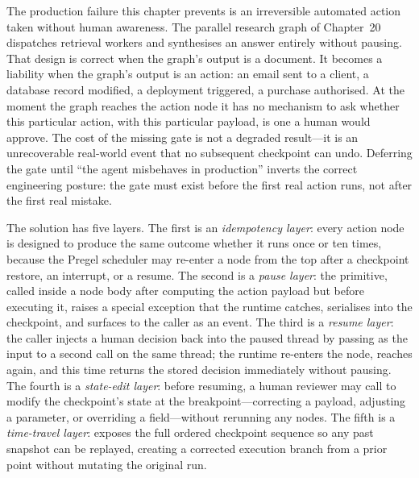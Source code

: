 

The production failure this chapter prevents is an irreversible automated
action taken without human awareness. The parallel research graph of
Chapter~20 dispatches retrieval workers and synthesises an answer entirely
without pausing. That design is correct when the graph's output is a
document. It becomes a liability when the graph's output is an action: an
email sent to a client, a database record modified, a deployment triggered,
a purchase authorised. At the moment the graph reaches the action node it
has no mechanism to ask whether this particular action, with this particular
payload, is one a human would approve. The cost of the missing gate is not a
degraded result---it is an unrecoverable real-world event that no subsequent
checkpoint can undo. Deferring the gate until ``the agent misbehaves in
production'' inverts the correct engineering posture: the gate must exist
before the first real action runs, not after the first real mistake.

The solution has five layers. The first is an \emph{idempotency layer}:
every action node is designed to produce the same outcome whether it runs
once or ten times, because the Pregel scheduler may re-enter a node from
the top after a checkpoint restore, an interrupt, or a resume. The second
is a \emph{pause layer}: the  primitive, called inside a
node body after computing the action payload but before executing it, raises
a special exception that the runtime catches, serialises into the checkpoint,
and surfaces to the caller as an  event. The third is a
\emph{resume layer}: the caller injects a human decision back into the paused
thread by passing  as the input to a second
 call on the same thread; the runtime re-enters the node,
reaches  again, and this time returns the stored decision
immediately without pausing. The fourth is a \emph{state-edit layer}: before
resuming, a human reviewer may call  to modify
the checkpoint's state at the breakpoint---correcting a payload, adjusting a
parameter, or overriding a field---without rerunning any nodes. The fifth is
a \emph{time-travel layer}:  exposes the full
ordered checkpoint sequence so any past snapshot can be replayed, creating a
corrected execution branch from a prior point without mutating the original
run.

